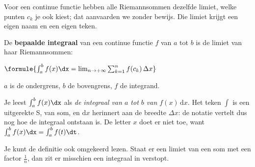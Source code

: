 Voor een continue functie hebben alle Riemannsommen dezelfde limiet, welke punten $c_k$ je ook kiest; dat aanvaarden we zonder bewijs. Die limiet krijgt een eigen naam en een eigen teken.

\begin{theorie}
De \textbf{\textcolor{accent}{bepaalde integraal}} van een continue functie $f$ van $a$ tot $b$ is de limiet van haar Riemannsommen:

\vspace{1mm}
\qquad $\formule{\int_a^b f(x)\dx = \lim_{n \to +\infty} \sum_{k=1}^{n} f(c_k)\,\Delta x}$

\vspace{1mm}
$a$ is de ondergrens, $b$ de bovengrens, $f$ de integrand.
\end{theorie}

Je leest $\int_a^b f(x)\dx$ als \textit{de integraal van $a$ tot $b$ van $f(x)\,\mathrm{d}x$}. Het teken $\int$ is een uitgerekte S, van som, en $\mathrm{d}x$ herinnert aan de breedte $\Delta x$: de notatie vertelt dus nog hoe de integraal ontstaan is. De letter $x$ doet er niet toe, want $\int_a^b f(x)\dx = \int_a^b f(t)\dt$.

Je kunt de definitie ook omgekeerd lezen. Staat er een limiet van een som met een factor $\tfrac1n$, dan zit er misschien een integraal in verstopt.



